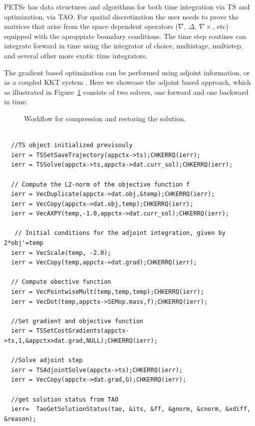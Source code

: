 \documentclass[10pt]{article}
\begin{document}
PETSc has data structures and algorithms for both time integration via TS and optimization, via TAO.
For spatial discretization the user needs to prove the matrices that arise from the space dependent operators ($\nabla,\ \Delta,\ \nabla \times$, etc) equipped with the aproppiate boundary conditions. The time step routines can integrate forward in time using the integrator of choice, multistage, multistep, and several other more exotic time integrators.

The gradient based optimization can be performed using adjoint information, or as a coupled KKT system \cite{Haber_2007}. Here we showcase the adjoint based approach, which as illustrated in Figure~\ref{fig:algorithm} consists of two solvers, one forward and one backward in time.

\begin{figure}
\begin{center}
\end{center}
 \caption{Workflow for compression and restoring the solution.} 
  \label{fig:algorithm}
\end{figure}
\lstset{language=C,numbers=left,
    stepnumber=5,
    showstringspaces=false,
    tabsize=2,
    breaklines=true,
    breakatwhitespace=true}
\begin{lstlisting}[caption=PETSc code for PDE constrained optimization via adjoints, label=codemat]

  //TS object initialized previsouly
  ierr = TSSetSaveTrajectory(appctx->ts);CHKERRQ(ierr);
  ierr = TSSolve(appctx->ts,appctx->dat.curr_sol);CHKERRQ(ierr);
  
  // Compute the L2-norm of the objective function f
  ierr = VecDuplicate(appctx->dat.obj,&temp);CHKERRQ(ierr);
  ierr = VecCopy(appctx->dat.obj,temp);CHKERRQ(ierr);
  ierr = VecAXPY(temp,-1.0,appctx->dat.curr_sol);CHKERRQ(ierr);
  
   // Initial conditions for the adjoint integration, given by 2*obj'=temp    
  ierr = VecScale(temp, -2.0);
  ierr = VecCopy(temp,appctx->dat.grad);CHKERRQ(ierr);
  
  // Compute obective function
  ierr = VecPointwiseMult(temp,temp,temp);CHKERRQ(ierr);
  ierr = VecDot(temp,appctx->SEMop.mass,f);CHKERRQ(ierr);
  
  //Set gradient and objective function
  ierr = TSSetCostGradients(appctx->ts,1,&appctx>dat.grad,NULL);CHKERRQ(ierr);
       
  //Solve adjoint step
  ierr = TSAdjointSolve(appctx->ts);CHKERRQ(ierr);
  ierr = VecCopy(appctx->dat.grad,G);CHKERRQ(ierr);
  
  //get solution status from TAO
  ierr=  TaoGetSolutionStatus(tao, &its, &ff, &gnorm, &cnorm, &xdiff, &reason);
\end{lstlisting}
\end{document}
